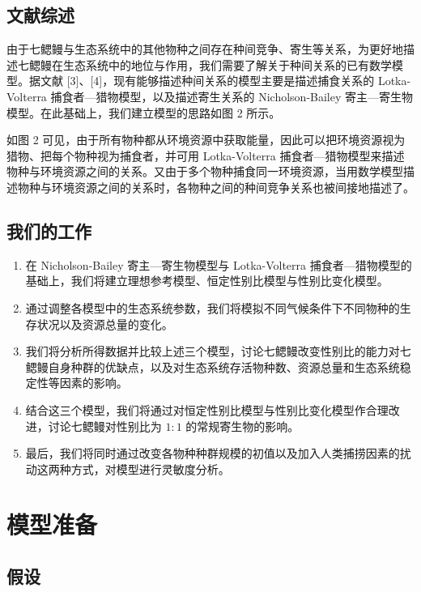 \documentclass[11pt,a4paper]{ctexart}
\begin{document}
\subsection{文献综述}

由于七鳃鳗与生态系统中的其他物种之间存在种间竞争、寄生等关系，为更好地描述七鳃鳗在生态系统中的地位与作用，我们需要了解关于种间关系的已有数学模型。据文献 [3]、[4]，现有能够描述种间关系的模型主要是描述捕食关系的 Lotka-Volterra 捕食者—猎物模型，以及描述寄生关系的 Nicholson-Bailey 寄主—寄生物模型。在此基础上，我们建立模型的思路如图 2 所示。

如图 2 可见，由于所有物种都从环境资源中获取能量，因此可以把环境资源视为猎物、把每个物种视为捕食者，并可用 Lotka-Volterra 捕食者—猎物模型来描述物种与环境资源之间的关系。又由于多个物种捕食同一环境资源，当用数学模型描述物种与环境资源之间的关系时，各物种之间的种间竞争关系也被间接地描述了。

\subsection{我们的工作}

\begin{enumerate}
\item 在 Nicholson-Bailey 寄主—寄生物模型与 Lotka-Volterra 捕食者—猎物模型的基础上，我们将建立理想参考模型、恒定性别比模型与性别比变化模型。
\item 通过调整各模型中的生态系统参数，我们将模拟不同气候条件下不同物种的生存状况以及资源总量的变化。
\item 我们将分析所得数据并比较上述三个模型，讨论七鳃鳗改变性别比的能力对七鳃鳗自身种群的优缺点，以及对生态系统存活物种数、资源总量和生态系统稳定性等因素的影响。
\item 结合这三个模型，我们将通过对恒定性别比模型与性别比变化模型作合理改进，讨论七鳃鳗对性别比为 $1:1$ 的常规寄生物的影响。
\item 最后，我们将同时通过改变各物种种群规模的初值以及加入人类捕捞因素的扰动这两种方式，对模型进行灵敏度分析。
\end{enumerate}

\section{模型准备}

\subsection{假设}
\end{document}
